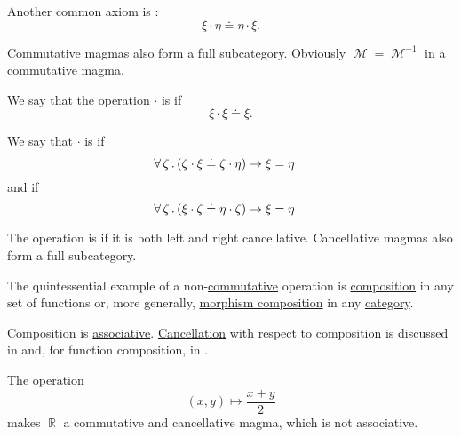 \begin{definition}
\begin{thmenum}[resume=def:magma]
     Another common axiom is :
    \begin{equation}\label{eq:def:magma/commutative}
      \xi \cdot \eta \doteq \eta \cdot \xi.
    \end{equation}

    Commutative magmas also form a full subcategory. Obviously \( \mscrM = \mscrM^{-1} \) in a commutative magma.

     We say that the operation \( \cdot \) is  if
    \begin{equation}\label{eq:def:magma/idempotent}
      \xi \cdot \xi \doteq \xi.
    \end{equation}

     We say that \( \cdot \) is  if
    \begin{equation}\label{eq:def:magma/cancellative/left}
      \forall \thinspace \zeta \thinspace . \thinspace (\zeta \cdot \xi \doteq \zeta \cdot \eta) \rightarrow \xi = \eta
      \quad
    \end{equation}
    and  if
    \begin{equation}\label{eq:def:magma/cancellative/right}
      \forall \thinspace \zeta \thinspace . \thinspace (\xi \cdot \zeta \doteq \eta \cdot \zeta) \rightarrow \xi = \eta
      \quad
    \end{equation}

    The operation is  if it is both left and right cancellative. Cancellative magmas also form a full subcategory.
  \end{thmenum}
\end{definition}

\begin{example}\label{ex:def:magma}
  \hfill
  \begin{thmenum}
     The quintessential example of a non-\hyperref[def:magma/commutative]{commutative} operation is \hyperref[def:multi_valued_function/composition]{composition} in any set of functions or, more generally, \hyperref[def:category/composition]{morphism composition} in any \hyperref[def:category]{category}.

    Composition is \hyperref[def:magma/associative]{associative}. \hyperref[def:magma/cancellative]{Cancellation} with respect to composition is discussed in  and, for function composition, in .

     The operation
    \begin{equation*}
      (x, y) \mapsto \dfrac {x + y} 2
    \end{equation*}
    makes \( \BbbR \) a commutative and cancellative magma, which is not associative.
  \end{thmenum}
\end{example}

